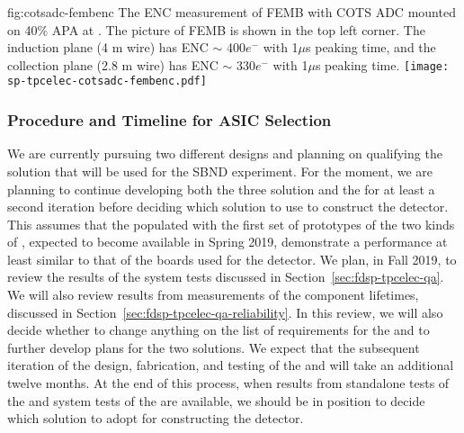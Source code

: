 \begin{dunefigure}
{fig:cotsadc-fembenc}
	{The ENC measurement of FEMB with COTS ADC mounted on 40\% APA at . The picture of FEMB is shown in the top left corner. The induction plane (4 m wire) has ENC $\sim$ 400$e^-$ with 1$\mu$s peaking time, and the collection plane (2.8 m wire) has ENC $\sim$ 330$e^-$ with 1$\mu$s peaking time.}
\texttt{[image: sp-tpcelec-cotsadc-fembenc.pdf]}
\end{dunefigure}

\subsubsection{Procedure and Timeline for ASIC Selection}
\label{sec:fdsp-tpcelec-design-femb-selection}

We are currently pursuing two different  designs
and planning on qualifying the   solution that will be used for the SBND experiment.
For the moment, we are planning to continue developing 
both the three  solution and  the  
for at least a second iteration before deciding which  solution to use to construct
the   detector. This assumes that the 
populated with the first set of prototypes of the two kinds of
, expected to become available in Spring 2019,
demonstrate a performance at least similar to that of the
boards used for the  detector. We plan, in Fall 2019, to review the results of the system tests
discussed in Section~\ref{sec:fdsp-tpcelec-qa}. We will also
review results from measurements of the component lifetimes,
discussed in Section~\ref{sec:fdsp-tpcelec-qa-reliability}. In this review,
we will also decide whether to change anything on the list
of requirements for the  and to further develop
plans for the two solutions. We expect that the subsequent iteration
of the design, fabrication, and testing of the  and
 will take an additional twelve months. At
the end of this process, when results from standalone tests of the
 and system tests of the  are
available, we should be in position to decide which 
solution to adopt for constructing the   detector.

